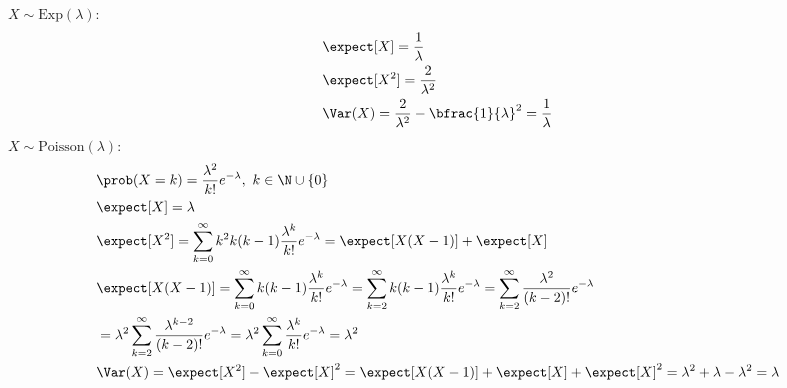 $X\sim\mathrm{Exp}(\lambda)$:
\begin{align*}
    &\expect[X]=\frac{1}{\lambda}\\
    &\expect[X^2]=\frac{2}{\lambda^2}\\
    &\Var(X)=\frac{2}{\lambda^2}-\bfrac{1}{\lambda}^2=\frac{1}{\lambda}
\end{align*}
$X\sim\mathrm{Poisson}(\lambda)$:
\begin{align*}
    &\prob(X=k)=\frac{\lambda^2}{k!}e^{-\lambda},\ k\in\N\cup\{0\}\\
    &\expect[X]=\lambda\\
    &\expect[X^2]=\sum_{k=0}^\infty k^2 k(k-1)\frac{\lambda^k}{k!}e^{-\lambda}=\expect[X(X-1)]+\expect[X]\\
    &\expect[X(X-1)]=\sum_{k=0}^\infty k(k-1)\frac{\lambda^k}{k!}e^{-\lambda}=\sum_{k=2}^\infty k(k-1)\frac{\lambda^k}{k!}e^{-\lambda}=\sum_{k=2}^\infty\frac{\lambda^2}{(k-2)!}e^{-\lambda}\\
    &=\lambda^2\sum_{k=2}^\infty\frac{\lambda^{k-2}}{(k-2)!}e^{-\lambda}=\lambda^2\sum_{k=0}^\infty\frac{\lambda^k}{k!}e^{-\lambda}=\lambda^2\\
    &\Var(X)=\expect[X^2]-\expect[X]^2=\expect[X(X-1)]+\expect[X]+\expect[X]^2=\lambda^2+\lambda-\lambda^2=\lambda
\end{align*}


